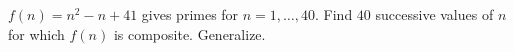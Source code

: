 $f(n) = n^2 - n + 41$ gives primes for $n = 1, \ldots, 40$. Find $40$ successive values of $n$ for which $f(n)$ is composite. Generalize.
